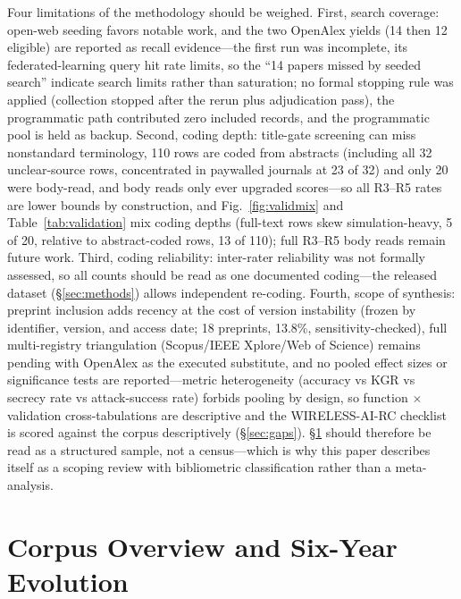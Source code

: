 \documentclass[11pt,a4paper]{article}
\begin{document}
Four limitations of the methodology should be weighed. First, search coverage: open-web seeding favors notable work, and the two OpenAlex yields (14 then 12 eligible) are reported as recall evidence---the first run was incomplete, its federated-learning query hit rate limits, so the ``14 papers missed by seeded search'' indicate search limits rather than saturation; no formal stopping rule was applied (collection stopped after the rerun plus adjudication pass), the programmatic path contributed zero included records, and the programmatic pool is held as backup. Second, coding depth: title-gate screening can miss nonstandard terminology, 110 rows are coded from abstracts (including all 32 unclear-source rows, concentrated in paywalled journals at 23 of 32) and only 20 were body-read, and body reads only ever upgraded scores---so all R3--R5 rates are lower bounds by construction, and Fig.~\ref{fig:validmix} and Table~\ref{tab:validation} mix coding depths (full-text rows skew simulation-heavy, 5 of 20, relative to abstract-coded rows, 13 of 110); full R3--R5 body reads remain future work. Third, coding reliability: inter-rater reliability was not formally assessed, so all counts should be read as one documented coding---the released dataset (\S\ref{sec:methods}) allows independent re-coding. Fourth, scope of synthesis: preprint inclusion adds recency at the cost of version instability (frozen by identifier, version, and access date; 18 preprints, 13.8\%, sensitivity-checked), full multi-registry triangulation (Scopus/IEEE Xplore/Web of Science) remains pending with OpenAlex as the executed substitute, and no pooled effect sizes or significance tests are reported---metric heterogeneity (accuracy vs KGR vs secrecy rate vs attack-success rate) forbids pooling by design, so function $\times$ validation cross-tabulations are descriptive and the WIRELESS-AI-RC checklist is scored against the corpus descriptively (\S\ref{sec:gaps}). \S\ref{sec:corpus} should therefore be read as a structured sample, not a census---which is why this paper describes itself as a scoping review with bibliometric classification rather than a meta-analysis.

\section{Corpus Overview and Six-Year Evolution}
\label{sec:corpus}
\end{document}
